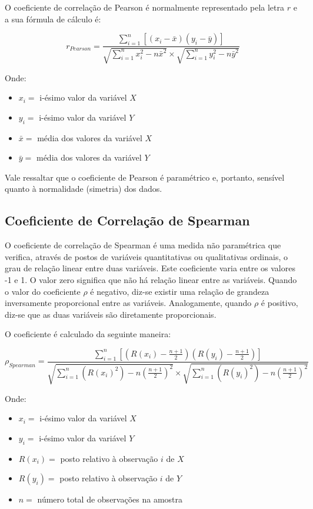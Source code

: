 \documentclass[
]{estat/estat}
\providecommand{\tightlist}{%
  \setlength{\itemsep}{0pt}\setlength{\parskip}{0pt}}\usepackage{longtable,booktabs,array}
\begin{document}
O coeficiente de correlação de Pearson é normalmente representado pela
letra \(r\) e a sua fórmula de cálculo é:

\[
r_{Pearson} = \frac{\displaystyle \sum_{i=1}^{n} \left [ \left(x_i-\bar{x}\right) \left(y_i-\bar{y}\right) \right]}{\sqrt{\displaystyle \sum_{i=1}^{n} x_i^2 - n\bar{x}^2}  \times \sqrt{\displaystyle \sum_{i=1}^{n} y_i^2 - n\bar{y}^2}}
\]

Onde:

\begin{itemize}
\tightlist
\item
  \(x_i =\) i-ésimo valor da variável \(X\)
\item
  \(y_i =\) i-ésimo valor da variável \(Y\)
\item
  \(\bar{x} =\) média dos valores da variável \(X\)
\item
  \(\bar{y} =\) média dos valores da variável \(Y\)
\end{itemize}

Vale ressaltar que o coeficiente de Pearson é paramétrico e, portanto,
sensível quanto à normalidade (simetria) dos dados.

\subsection{Coeficiente de Correlação de
Spearman}\label{coeficiente-de-correlauxe7uxe3o-de-spearman}

O coeficiente de correlação de Spearman é uma medida não paramétrica que
verifica, através de postos de variáveis quantitativas ou qualitativas
ordinais, o grau de relação linear entre duas variáveis. Este
coeficiente varia entre os valores -1 e 1. O valor zero significa que
não há relação linear entre as variáveis. Quando o valor do coeficiente
\(\rho\) é negativo, diz-se existir uma relação de grandeza inversamente
proporcional entre as variáveis. Analogamente, quando \(\rho\) é
positivo, diz-se que as duas variáveis são diretamente proporcionais.

O coeficiente é calculado da seguinte maneira:

\[
\rho_{Spearman} = \frac{ \displaystyle \sum_{i=1}^{n}  \left[\left(R(x_i)-\frac{n+1}{2}\right)\left(R(y_i)-\frac{n+1}{2}\right)\right]}
{\sqrt{\displaystyle \sum_{i=1}^{n}  \left(R(x_i)^2\right)-n\left(\frac{n+1}{2}\right)^{2}}  \times \sqrt{\displaystyle \sum_{i=1}^{n}  \left(R(y_i)^2 \right) -n\left(\frac{n+1}{2}\right)^{2}}}
\]

Onde:

\begin{itemize}
\tightlist
\item
  \(x_i =\) i-ésimo valor da variável \(X\)
\item
  \(y_i =\) i-ésimo valor da variável \(Y\)
\item
  \(R(x_i) =\) posto relativo à observação \(i\) de \(X\)
\item
  \(R(y_i) =\) posto relativo à observação \(i\) de \(Y\)
\item
  \(n =\) número total de observações na amostra
\end{itemize}
\end{document}

